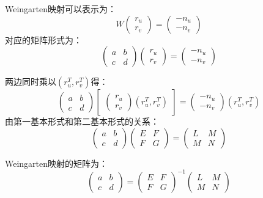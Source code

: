 \documentclass[lang=cn,10pt,thmcnt=section]{elegantbook}
\begin{document}
        Weingarten映射可以表示为：
        \[
        W \begin{pmatrix} r_u \\ r_v \end{pmatrix} = \begin{pmatrix} -n_u \\ -n_v \end{pmatrix}
        \]
        对应的矩阵形式为：
        \[
        \begin{pmatrix} a & b \\ c & d \end{pmatrix} \begin{pmatrix} r_u \\ r_v \end{pmatrix} = \begin{pmatrix} -n_u \\ -n_v \end{pmatrix}
        \]
        
        两边同时乘以$(r_u^T, r_v^T)$得：
        \[
        \begin{pmatrix} a & b \\ c & d \end{pmatrix} 
        \begin{bmatrix} 
        \begin{pmatrix} r_u \\ r_v \end{pmatrix} 
        (r_u^T, r_v^T) 
        \end{bmatrix} 
        = \begin{pmatrix} -n_u \\ -n_v \end{pmatrix} 
        (r_u^T, r_v^T)
        \]
        由第一基本形式和第二基本形式的关系：
        \[
        \begin{pmatrix} a & b \\ c & d \end{pmatrix}
        \begin{pmatrix} E & F \\ F & G \end{pmatrix}
        = \begin{pmatrix} L & M \\ M & N \end{pmatrix}
        \]
        
        Weingarten映射的矩阵为：
        \[
        \begin{pmatrix} a & b \\ c & d \end{pmatrix}
        = \begin{pmatrix} E & F \\ F & G \end{pmatrix}^{-1}
        \begin{pmatrix} L & M \\ M & N \end{pmatrix}
        \]
        
\end{document}
